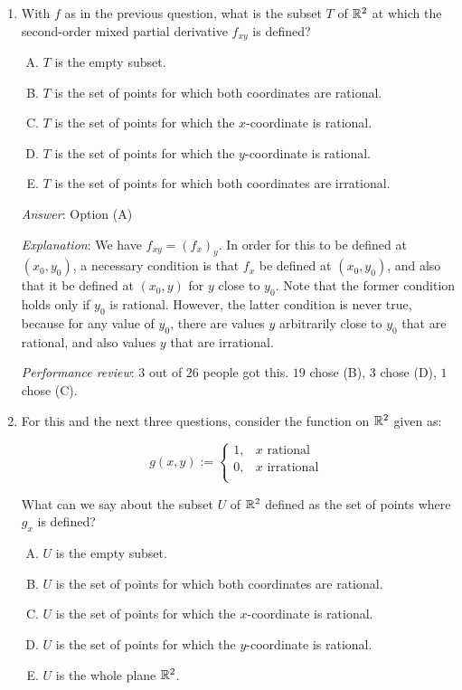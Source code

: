 \documentclass[10pt]{amsart}
\begin{document}
\begin{enumerate}
\item With $f$ as in the previous question, what is the subset $T$ of
  $\mathbb{R}^2$ at which the second-order mixed partial derivative $f_{xy}$
  is defined?
  
  \begin{enumerate}[(A)]
  \item $T$ is the empty subset.
  \item $T$ is the set of points for which both coordinates are rational.
  \item $T$ is the set of points for which the $x$-coordinate is rational.
  \item $T$ is the set of points for which the $y$-coordinate is rational.
  \item $T$ is the set of points for which both coordinates are
    irrational.
  \end{enumerate}

  {\em Answer}: Option (A)

  {\em Explanation}: We have $f_{xy} = (f_x)_y$. In order for this to
  be defined at $(x_0,y_0)$, a necessary condition is that $f_x$ be
  defined at $(x_0,y_0)$, and also that it be defined at $(x_0,y)$ for
  $y$ close to $y_0$. Note that the former condition holds only if
  $y_0$ is rational. However, the latter condition is never true,
  because for any value of $y_0$, there are values $y$ arbitrarily
  close to $y_0$ that are rational, and also values $y$ that are
  irrational.

  {\em Performance review}: $3$ out of $26$ people got this. $19$ chose
  (B), $3$ chose (D), $1$ chose (C).

\item For this and the next three questions, consider the function on $\mathbb{R}^2$
  given as:

  $$g(x,y) := \left\lbrace \begin{array}{rl} 1, & x \text{ rational}\\0, & x \text{ irrational } \\\end{array}\right.$$

  What can we say about the subset $U$ of $\mathbb{R}^2$ defined as the set of
  points where $g_x$ is defined?

  \begin{enumerate}[(A)]
  \item $U$ is the empty subset.
  \item $U$ is the set of points for which both coordinates are rational.
  \item $U$ is the set of points for which the $x$-coordinate is rational.
  \item $U$ is the set of points for which the $y$-coordinate is rational.
  \item $U$ is the whole plane $\mathbb{R}^2$.
  \end{enumerate}


\end{enumerate}
\end{document}
